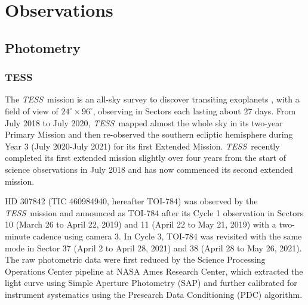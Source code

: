 \documentclass[twocolumn]{aastex631}
\newcommand{\tess}{\textit{TESS}\ }
\begin{document}
\section{Observations}
\label{sec:observations}

\subsection{Photometry}
\label{sec:Photometry} %




\subsubsection{TESS}
\label{sec:TESS}

The \tess mission is an all-sky survey to discover transiting exoplanets \citep{ricker2015}, with a field of view of $24^{\circ}\times 96^{\circ}$, observing in Sectors each lasting about 27 days. From July 2018 to July 2020, \tess mapped almost the whole sky in its two-year Primary Mission and then re-observed the southern ecliptic hemisphere during Year 3 (July 2020-July 2021) for its first Extended Mission. \tess recently completed its first extended mission slightly over four years from the start of science observations in July 2018 and has now commenced its second extended mission. %

HD 307842 (TIC 460984940, hereafter TOI-784) was observed by the \tess mission and announced as TOI-784 after its Cycle 1 observation in Sectors 10 (March 26 to April 22, 2019) and 11 (April 22 to May 21, 2019) with a two-minute cadence using camera 3. In Cycle 3, TOI-784 was revisited with the same mode in Sector 37 (April 2 to April 28, 2021) and 38 (April 28 to May 26, 2021). The raw photometric data were first reduced by the Science Processing Operations Center \citep[SPOC;][]{Jenkins:2016} pipeline at NASA Ames Research Center, which extracted the light curve using Simple Aperture Photometry (SAP) and further calibrated for instrument systematics using the Presearch Data Conditioning (PDC) algorithm. 
\end{document}

